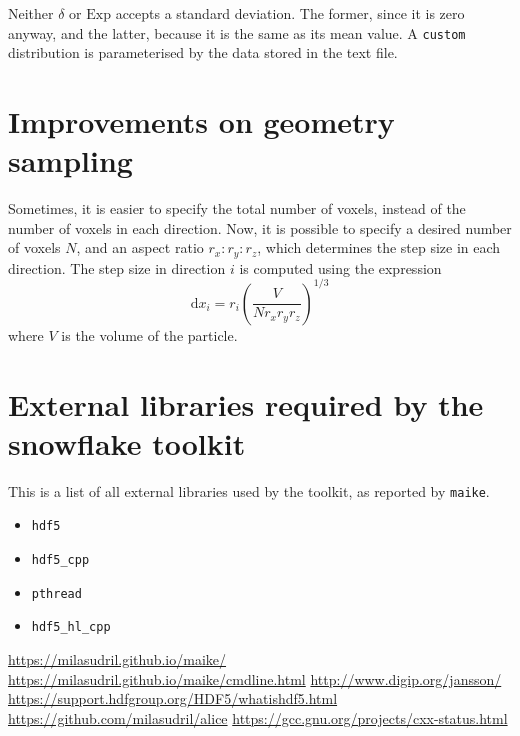 \documentclass[a4paper,10pt]{scrartcl}
\newcommand{\prgname}[1]{\texttt{#1}}
\newcommand{\dd}{\mathrm{d}}
\begin{document}
Neither $\delta$ or $\text{Exp}$ accepts a standard deviation. The former, since it is zero anyway, and the latter, because it is the same as its mean value. A \texttt{custom} distribution is parameterised by the data stored in the text file.


\section{Improvements on geometry sampling}
Sometimes, it is easier to specify the total number of voxels, instead of the number of voxels in each direction. Now, it is possible to specify a desired number of voxels $N$, and an aspect ratio $r_x:r_y:r_z$, which determines the step size in each direction. The step size in direction $i$ is computed using the expression
\[
 \dd x_i = r_i \left(\frac{V}{N r_x r_y r_z}\right)^{1/3}
\]
where $V$ is the volume of the particle.

\appendix

\section{External libraries required by the snowflake toolkit}
\label{deps}
This is a list of all external libraries used by the toolkit, as reported by \prgname{maike}.

\begin{itemize}
 \item \texttt{hdf5}
 \item \texttt{hdf5\_cpp}
 \item \texttt{pthread}
 \item \texttt{hdf5\_hl\_cpp}
 \end{itemize}
 

\begin{thebibliography}{9}
 \url{https://milasudril.github.io/maike/}
 \url{https://milasudril.github.io/maike/cmdline.html}
 \url{http://www.digip.org/jansson/}
 \url{https://support.hdfgroup.org/HDF5/whatishdf5.html}
 \url{https://github.com/milasudril/alice}
 \url{https://gcc.gnu.org/projects/cxx-status.html}
\end{thebibliography}
\end{document}

